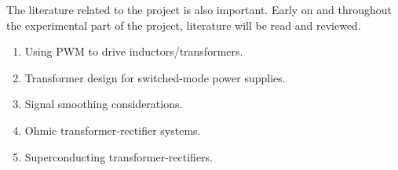 \documentclass[11pt, a4paper, twoside, openright]{article}
\begin{document}
The literature related to the project is also important. Early on and throughout the experimental part of the project, literature will be read and reviewed.
\begin{enumerate}
	\item Using PWM to drive inductors/transformers.
	\item Transformer design for switched-mode power supplies.
	\item Signal smoothing considerations.
	\item Ohmic transformer-rectifier systems.
	\item Superconducting transformer-rectifiers.
\end{enumerate}





\end{document}
